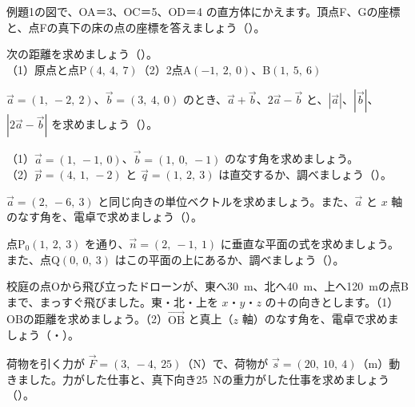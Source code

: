 \bkendproblems
{}

\bkproblem 例題1の図で、OA＝3、OC＝5、OD＝4 の直方体にかえます。頂点F、Gの座標と、点Fの真下の床の点の座標を答えましょう（）。

\bkproblem 次の距離を求めましょう（）。\\
（1）原点と点P$(4,\ 4,\ 7)$\qquad（2）2点A$(-1,\ 2,\ 0)$、B$(1,\ 5,\ 6)$

\bkproblem $\vec a=(1,\ -2,\ 2)$、$\vec b=(3,\ 4,\ 0)$ のとき、$\vec a+\vec b$、$2\vec a-\vec b$ と、$|\vec a|$、$|\vec b|$、$|2\vec a-\vec b|$ を求めましょう（）。

\bkproblem （1）$\vec a=(1,\ -1,\ 0)$、$\vec b=(1,\ 0,\ -1)$ のなす角を求めましょう。\\
（2）$\vec p=(4,\ 1,\ -2)$ と $\vec q=(1,\ 2,\ 3)$ は直交するか、調べましょう（）。

\bkproblem $\vec a=(2,\ -6,\ 3)$ と同じ向きの単位ベクトルを求めましょう。また、$\vec a$ と $x$ 軸のなす角を、電卓で求めましょう（）。

\bkproblem 点P$_0(1,\ 2,\ 3)$ を通り、$\vec n=(2,\ -1,\ 1)$ に垂直な平面の式を求めましょう。また、点Q$(0,\ 0,\ 3)$ はこの平面の上にあるか、調べましょう（）。


\bkproblem 校庭の点Oから飛び立ったドローンが、東へ\qty{30}{m}、北へ\qty{40}{m}、上へ\qty{120}{m}の点Bまで、まっすぐ飛びました。東・北・上を $x$・$y$・$z$ の＋の向きとします。（1）OBの距離を求めましょう。（2）$\overrightarrow{\mathrm{OB}}$ と真上（$z$ 軸）のなす角を、電卓で求めましょう（・）。

\bkproblem 荷物を引く力が $\vec F=(3,\ -4,\ 25)$（N）で、荷物が $\vec s=(20,\ 10,\ 4)$（m）動きました。力がした仕事と、真下向き\qty{25}{N}の重力がした仕事を求めましょう（）。

